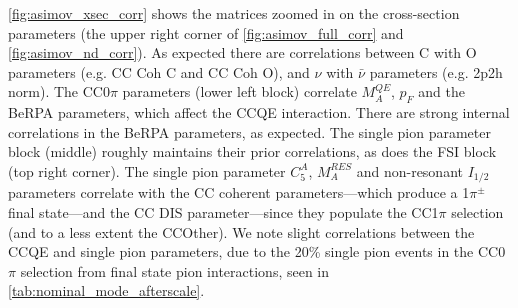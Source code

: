 \autoref{fig:asimov_xsec_corr} shows the matrices zoomed in on the cross-section parameters (the upper right corner of \autoref{fig:asimov_full_corr} and \autoref{fig:asimov_nd_corr}). As expected there are correlations between C with O parameters (e.g. CC Coh C and CC Coh O), and $\nu$ with $\bar{\nu}$ parameters (e.g. 2p2h norm). The CC0$\pi$ parameters (lower left block) correlate $M_A^{QE}$, $p_F$ and the BeRPA parameters, which affect the CCQE interaction. There are strong internal correlations in the BeRPA parameters, as expected. The single pion parameter block (middle) roughly maintains their prior correlations, as does the FSI block (top right corner). The single pion parameter $C_5^A$, $M_A^{RES}$ and non-resonant $I_{1/2}$ parameters correlate with the CC coherent parameters---which produce a 1$\pi^\pm$ final state---and the CC DIS parameter---since they populate the CC1$\pi$ selection (and to a less extent the CCOther). We note slight correlations between the CCQE and single pion parameters, due to the 20\% single pion events in the CC0$\pi$ selection from final state pion interactions, seen in \autoref{tab:nominal_mode_afterscale}.
